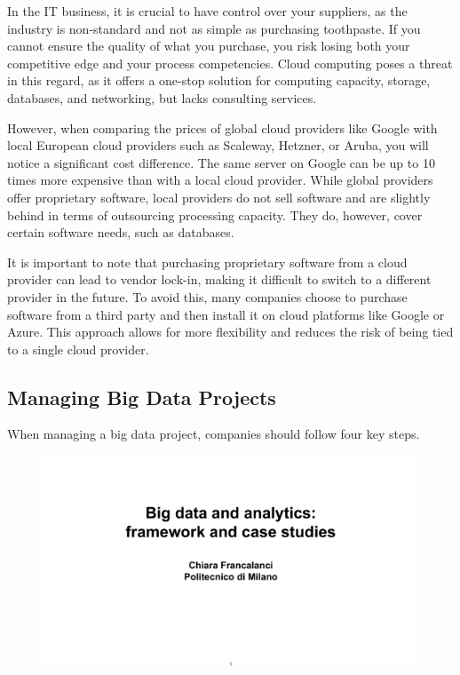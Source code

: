 In the IT business, it is crucial to have control over your suppliers,
as the industry is non-standard and not as simple as purchasing
toothpaste. If you cannot ensure the quality of what you purchase, you
risk losing both your competitive edge and your process competencies.
Cloud computing poses a threat in this regard, as it offers a one-stop
solution for computing capacity, storage, databases, and networking, but
lacks consulting services.

However, when comparing the prices of global cloud providers like Google
with local European cloud providers such as Scaleway, Hetzner, or Aruba,
you will notice a significant cost difference. The same server on Google
can be up to 10 times more expensive than with a local cloud provider.
While global providers offer proprietary software, local providers do
not sell software and are slightly behind in terms of outsourcing
processing capacity. They do, however, cover certain software needs,
such as databases.

It is important to note that purchasing proprietary software from a
cloud provider can lead to vendor lock-in, making it difficult to switch
to a different provider in the future. To avoid this, many companies
choose to purchase software from a third party and then install it on
cloud platforms like Google or Azure. This approach allows for more
flexibility and reduces the risk of being tied to a single cloud
provider.

\subsection{Managing Big Data Projects}

When managing a big data project, companies should follow four key
steps.

\begin{figure}[!h]
    \centering
    \includegraphics[page=84, trim = 1cm 2cm 1.5cm 4cm, clip, width=\textwidth]{images/06 - BIG_DATA.pdf}
\end{figure}

